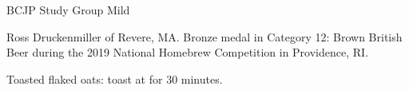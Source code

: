 \stylesection{\styledarkmild}

\begin{recipe}{BCJP Study Group Mild} %

\begin{aboutblock}
Ross Druckenmiller of Revere, MA. Bronze medal in Category 12: Brown British
Beer during the 2019 National Homebrew Competition in Providence, RI.
\sourceaha
\end{aboutblock}


\begin{methodandtiming}

\begin{mashsteps}
\end{mashsteps}

\begin{fermentationsteps}
\end{fermentationsteps}

\begin{directions}
Toasted flaked oats: toast at  for 30 minutes.
\end{directions}

\end{methodandtiming}

\recipebreak

\begin{ingredientsblock}

\begin{malts}
\end{malts}

\begin{hops}
\end{hops}


\end{ingredientsblock}

\end{recipe}


